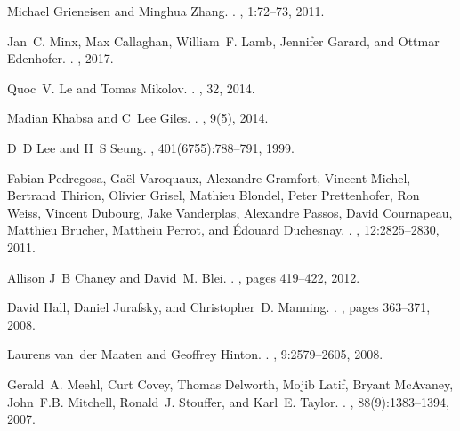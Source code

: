 \documentclass{article}
\begin{document}
\begin{thebibliography}{10}
	
	Michael Grieneisen and Minghua Zhang.
	.
	, 1:72--73, 2011.
	
	Jan~C. Minx, Max Callaghan, William~F. Lamb, Jennifer Garard, and Ottmar
	Edenhofer.
	.
	, 2017.
	
	Quoc~V. Le and Tomas Mikolov.
	.
	, 32, 2014.
	
	Madian Khabsa and C~Lee Giles.
	.
	, 9(5), 2014.
	
	D~D Lee and H~S Seung.
	, 401(6755):788--791, 1999.
	
	Fabian Pedregosa, Ga{\"{e}}l Varoquaux, Alexandre Gramfort, Vincent Michel,
	Bertrand Thirion, Olivier Grisel, Mathieu Blondel, Peter Prettenhofer, Ron
	Weiss, Vincent Dubourg, Jake Vanderplas, Alexandre Passos, David Cournapeau,
	Matthieu Brucher, Mattheiu Perrot, and {\'{E}}douard Duchesnay.
	.
	, 12:2825--2830, 2011.
	
	Allison J~B Chaney and David~M. Blei.
	.
	, pages 419--422, 2012.
	
	David Hall, Daniel Jurafsky, and Christopher~D. Manning.
	.
	, pages 363--371, 2008.
	
	Laurens van~der Maaten and Geoffrey Hinton.
	.
	, 9:2579--2605, 2008.
	
	Gerald~A. Meehl, Curt Covey, Thomas Delworth, Mojib Latif, Bryant McAvaney,
	John~F.B. Mitchell, Ronald~J. Stouffer, and Karl~E. Taylor.
	.
	,
	88(9):1383--1394, 2007.
	
\end{thebibliography}


\end{document}
